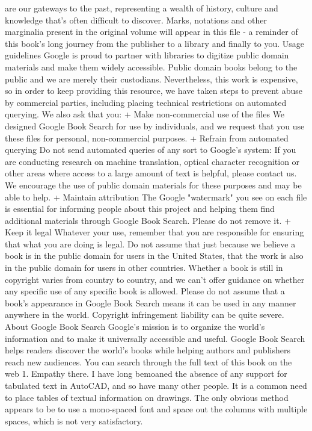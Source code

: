 \documentclass[a4paper]{article}
\begin{document}
are our gateways to the past, representing a wealth of history, culture and knowledge that's often difficult to discover. 
Marks, notations and other marginalia present in the original volume will appear in this file - a reminder of this book's long journey from the 
publisher to a library and finally to you. 
Usage guidelines 
Google is proud to partner with libraries to digitize public domain materials and make them widely accessible. Public domain books belong to the 
public and we are merely their custodians. Nevertheless, this work is expensive, so in order to keep providing this resource, we have taken steps to 
prevent abuse by commercial parties, including placing technical restrictions on automated querying. 
We also ask that you: 
+ Make non-commercial use of the files We designed Google Book Search for use by individuals, and we request that you use these files for 
personal, non-commercial purposes. 
+ Refrain from automated querying Do not send automated queries of any sort to Google's system: If you are conducting research on machine 
translation, optical character recognition or other areas where access to a large amount of text is helpful, please contact us. We encourage the 
use of public domain materials for these purposes and may be able to help. 
+ Maintain attribution The Google "watermark" you see on each file is essential for informing people about this project and helping them find 
additional materials through Google Book Search. Please do not remove it. 
+ Keep it legal Whatever your use, remember that you are responsible for ensuring that what you are doing is legal. Do not assume that just 
because we believe a book is in the public domain for users in the United States, that the work is also in the public domain for users in other 
countries. Whether a book is still in copyright varies from country to country, and we can't offer guidance on whether any specific use of 
any specific book is allowed. Please do not assume that a book's appearance in Google Book Search means it can be used in any manner 
anywhere in the world. Copyright infringement liability can be quite severe. 
About Google Book Search 
Google's mission is to organize the world's information and to make it universally accessible and useful. Google Book Search helps readers 
discover the world's books while helping authors and publishers reach new audiences. You can search through the full text of this book on the web 1. Empathy there. I have long bemoaned the absence of any support for tabulated text in AutoCAD, and so have many other people. It is a common need to place tables of textual information on drawings. The only obvious method appears to be to use a mono-spaced font and space out the columns with multiple spaces, which is not very satisfactory.
\end{document}
